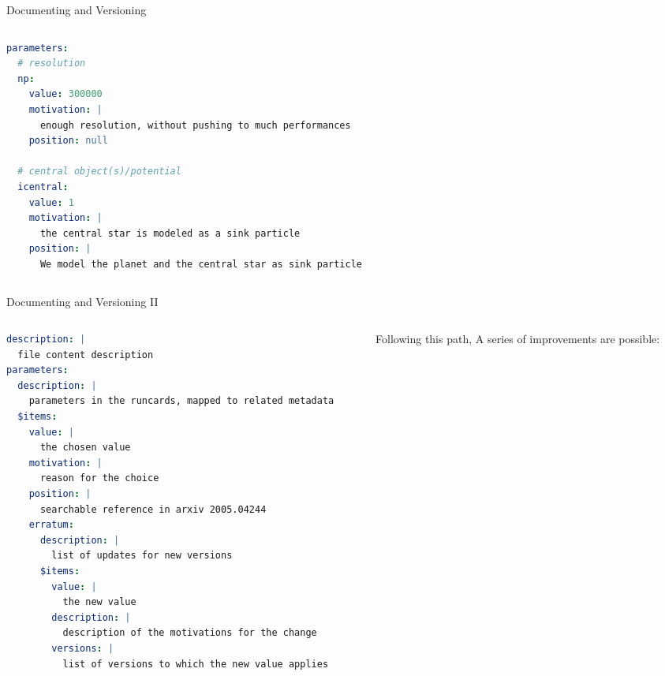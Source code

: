 \documentclass[9pt]{beamer}
\begin{document}
\begin{frame}[fragile]{Documenting and Versioning}
\begin{columns}
\begin{column}{0.5\textwidth}
\begin{lstlisting}[style=mystyle, language=yaml, breaklines=true, caption={
                Excerpt from the \texttt{describe-setup.yaml} file
            }]
parameters:
  # resolution
  np:
    value: 300000
    motivation: |
      enough resolution, without pushing to much performances
    position: null

  # central object(s)/potential
  icentral:
    value: 1
    motivation: |
      the central star is modeled as a sink particle
    position: |
      We model the planet and the central star as sink particle
\end{lstlisting}
        \end{column}
    \end{columns}
\end{frame}

\begin{frame}[fragile]{Documenting and Versioning II}
    \begin{columns}
        \begin{column}{0.5\textwidth}
            \begin{lstlisting}[language=yaml, style=mystyle, breaklines=true, caption={
                The \texttt{describe-schema.yaml} file
            }]
description: |
  file content description
parameters:
  description: |
    parameters in the runcards, mapped to related metadata
  $items:
    value: |
      the chosen value
    motivation: |
      reason for the choice
    position: |
      searchable reference in arxiv 2005.04244
    erratum:
      description: |
        list of updates for new versions
      $items:
        value: |
          the new value
        description: |
          description of the motivations for the change
        versions: |
          list of versions to which the new value applies
\end{lstlisting}
        \end{column}
        \begin{column}{0.5\textwidth}
            \vspace*{10pt}

            Following this path, A series of improvements are possible: 
            \vspace*{5pt}


\end{column}
\end{columns}
\end{frame}
\end{document}
